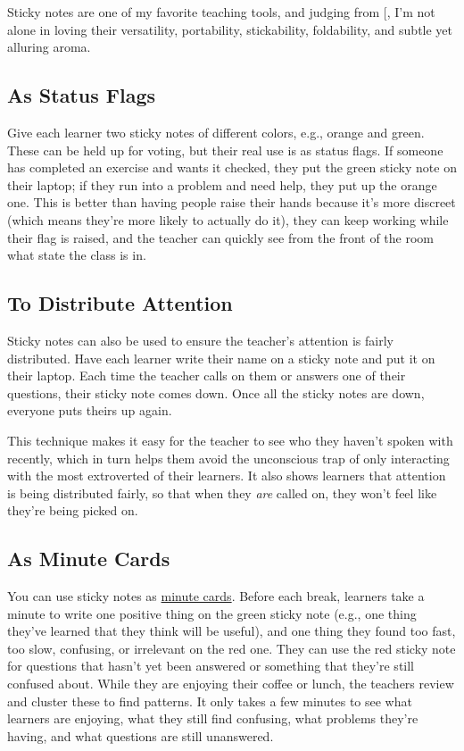 Sticky notes are one of my favorite teaching tools, and judging from
{[}\protect[\hyperlink{b:Ward2015}{Ward2015}]{]}, I'm not alone in loving their versatility,
portability, stickability, foldability, and subtle yet alluring aroma.

\subsection{As Status Flags}\label{s:classroom-status-flags}

Give each learner two sticky notes of different colors, e.g., orange and
green. These can be held up for voting, but their real use is as status
flags. If someone has completed an exercise and wants it checked, they
put the green sticky note on their laptop; if they run into a problem
and need help, they put up the orange one. This is better than having
people raise their hands because it's more discreet (which means they're
more likely to actually do it), they can keep working while their flag
is raised, and the teacher can quickly see from the front of the room
what state the class is in.

\subsection{To Distribute Attention}\label{s:classroom-attention}

Sticky notes can also be used to ensure the teacher's attention is
fairly distributed. Have each learner write their name on a sticky note
and put it on their laptop. Each time the teacher calls on them or
answers one of their questions, their sticky note comes down. Once all
the sticky notes are down, everyone puts theirs up again.

This technique makes it easy for the teacher to see who they haven't
spoken with recently, which in turn helps them avoid the unconscious
trap of only interacting with the most extroverted of their learners. It
also shows learners that attention is being distributed fairly, so that
when they \emph{are} called on, they won't feel like they're being picked on.

\subsection{As Minute Cards}\label{s:classroom-minute-cards}

You can use sticky notes as \protect\hyperlink{g:minute-cards}{minute cards}.
Before each break, learners take a minute to write one positive thing on
the green sticky note (e.g., one thing they've learned that they think
will be useful), and one thing they found too fast, too slow, confusing,
or irrelevant on the red one. They can use the red sticky note for
questions that hasn't yet been answered or something that they're still
confused about. While they are enjoying their coffee or lunch, the
teachers review and cluster these to find patterns. It only takes a few
minutes to see what learners are enjoying, what they still find
confusing, what problems they're having, and what questions are still
unanswered.

